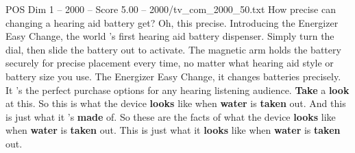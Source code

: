 \begin{textsample}{POS Dim 1 – 2000 – Score 5.00 – 2000/tv\_com\_2000\_50.txt}  \label{ex:f1_pos_074}
How precise can changing a hearing aid battery get?
Oh, this precise.
Introducing the Energizer Easy Change, the world 's first hearing aid battery dispenser.
Simply turn the dial, then slide the battery out to activate.
The magnetic arm holds the battery securely for precise placement every time, no matter what hearing aid style or battery size you use.
The Energizer Easy Change, it changes batteries precisely.
It 's the perfect purchase options for any hearing listening audience. \textbf{Take} a \textbf{look} at this.
So this is what the device \textbf{looks} like when \textbf{water} is \textbf{taken} out.
And this is just what it 's \textbf{made} of.
So these are the facts of what the device \textbf{looks} like when \textbf{water} is \textbf{taken} out.
This is just what it \textbf{looks} like when \textbf{water} is \textbf{taken} out.

\end{textsample}
